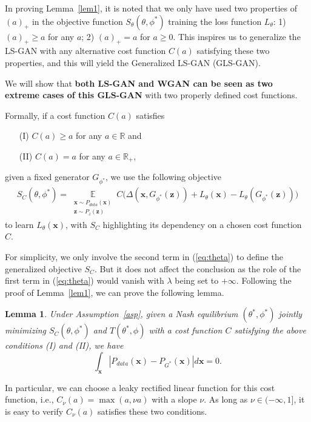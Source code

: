 \documentclass[11pt,fullpage, letterpaper,twoside]{article}
\newtheorem{lemma}{Lemma}
\newcommand{\1}[1]{\mathds{1}_{\left[#1\right]}}
\begin{document}
In proving Lemma~\ref{lem1}, it is noted that we only have used two properties of $(a)_+$ in the objective function $S_\theta(\theta,\phi^*)$ training the loss function $L_\theta$: 1) $(a)_+ \geq a$ for any $a$; 2) $(a)_+=a$ for $a\geq 0$. This inspires us to generalize the LS-GAN with any alternative cost function $C(a)$ satisfying these two properties, and this will yield the Generalized LS-GAN (GLS-GAN).

We will show that {\bf both LS-GAN and WGAN can be seen as two extreme cases of this GLS-GAN } with two properly defined cost functions.

Formally, if a cost function $C(a)$ satisfies
\begin{itemize}
\item[(I)] $C(a)\geq a$ for any $a\in\mathbb R$ and
\item[(II)] $C(a) = a$ for any $a\in\mathbb R_+$,
\end{itemize}
given a fixed generator $G_{\phi^*}$, we use the following objective
\begin{align}\label{eq:glsgan}
S_C(\theta,\phi^*)=
 \mathop \mathbb E\limits_{\substack{\mathbf x\sim P_{data}(\mathbf x) \\ \mathbf z\sim P_{z}(\mathbf z)}}C\big( \Delta(\mathbf x, G_{\phi^*}(\mathbf z)) + L_\theta(\mathbf x) - L_\theta(G_{\phi^*}(\mathbf z)) \big)\nonumber
\end{align}
to learn $L_\theta(\mathbf x)$, with $S_C$ highlighting its dependency on a chosen cost function $C$.

For simplicity, we only involve the second term in (\ref{eq:theta}) to define the generalized objective $S_C$. But it does not affect the conclusion as the role of the first term in (\ref{eq:theta}) would vanish with $\lambda$ being set to $+\infty$. Following the proof of Lemma~\ref{lem1}, we can prove the following lemma.
\begin{lemma}\label{lem5}
Under Assumption~\ref{asp}, given a Nash equilibrium $(\theta^*,\phi^*)$ jointly minimizing $S_C(\theta,\phi^*)$ and $T(\theta^*,\phi)$ with a cost function $C$ satisfying the above conditions (I) and (II), we have
$$
\int_{\mathbf x}|P_{data}(\mathbf x)-P_{G^*}(\mathbf x)|d\mathbf x = 0.
$$
\end{lemma}

In particular, we can choose a leaky rectified linear function for this cost function, i.e., $C_\nu(a)=\max(a,\nu a)$ with a slope $\nu$. As long as $\nu\in(-\infty,1]$, it is easy to verify $C_\nu(a)$ satisfies these two conditions.
\end{document}
